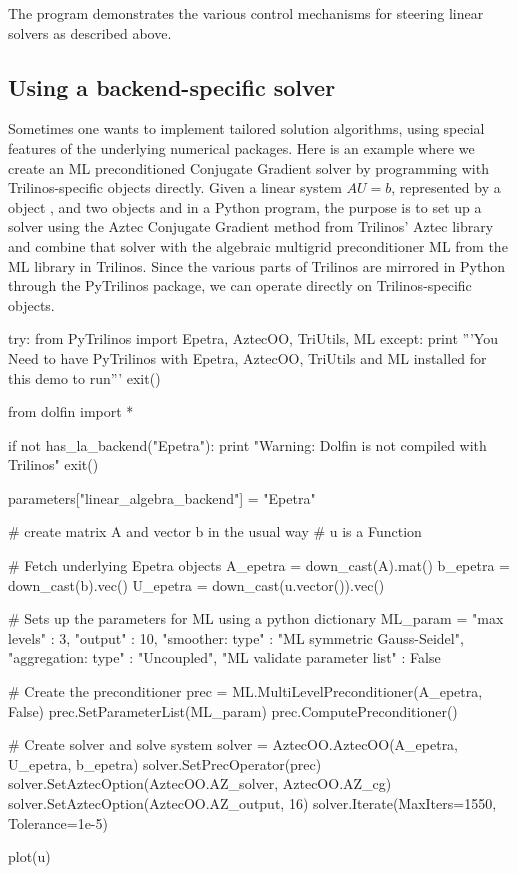 The program  demonstrates the various
control mechanisms for steering linear solvers as described above.

\subsection{Using a backend-specific solver}
\label{langtangen:Epetra}


Sometimes one wants to implement tailored solution algorithms, using
special features of the underlying numerical packages.  Here is
an example where we create an ML preconditioned Conjugate Gradient
solver by programming with Trilinos-specific objects directly.  Given a
linear system $AU=b$, represented by a  object , and
two  objects  and  in a Python program, the
purpose is to set up a solver using the Aztec Conjugate Gradient method
from Trilinos' Aztec library and combine that solver with the algebraic
multigrid preconditioner ML from the ML library in Trilinos. Since the
various parts of Trilinos are mirrored in Python through the PyTrilinos
package, we can operate directly on Trilinos-specific objects.
\begin{python}
try:
    from PyTrilinos import Epetra, AztecOO, TriUtils, ML
except:
    print '''You Need to have PyTrilinos with
Epetra, AztecOO, TriUtils and ML installed
for this demo to run'''
    exit()

from dolfin import *

if not has_la_backend("Epetra"):
    print "Warning: Dolfin is not compiled with Trilinos"
    exit()

parameters["linear_algebra_backend"] = "Epetra"

# create matrix A and vector b in the usual way
# u is a Function

# Fetch underlying Epetra objects
A_epetra = down_cast(A).mat()
b_epetra = down_cast(b).vec()
U_epetra = down_cast(u.vector()).vec()

# Sets up the parameters for ML using a python dictionary
ML_param = {"max levels"        : 3,
            "output"            : 10,
            "smoother: type"    : "ML symmetric Gauss-Seidel",
            "aggregation: type" : "Uncoupled",
            "ML validate parameter list" : False
}

# Create the preconditioner
prec = ML.MultiLevelPreconditioner(A_epetra, False)
prec.SetParameterList(ML_param)
prec.ComputePreconditioner()

# Create solver and solve system
solver = AztecOO.AztecOO(A_epetra, U_epetra, b_epetra)
solver.SetPrecOperator(prec)
solver.SetAztecOption(AztecOO.AZ_solver, AztecOO.AZ_cg)
solver.SetAztecOption(AztecOO.AZ_output, 16)
solver.Iterate(MaxIters=1550, Tolerance=1e-5)

plot(u)
\end{python}

